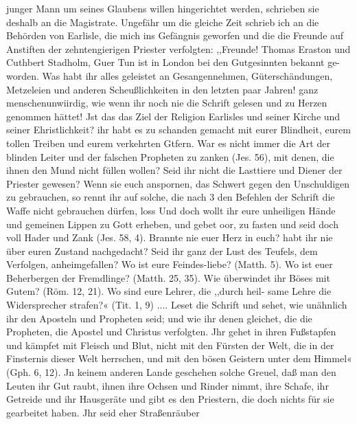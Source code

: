 junger Mann um seines Glaubens willen hingerichtet werden,
schrieben sie deshalb an die Magistrate.
Ungefähr um die gleiche Zeit schrieb ich an die Behörden
von Earlisle, die mich ins Gefängnis geworfen und die die
Freunde auf Anstiften der zehntengierigen Priester verfolgten:
,,Freunde! Thomas Eraston und Cuthbert Stadholm,
Guer Tun ist in London bei den Gutgesinnten bekannt ge-
worden. Was habt ihr alles geleistet an Gesangennehmen,
Güterschändungen, Metzeleien und anderen Scheußlichkeiten in den
letzten paar Jahren! ganz menschenunwiirdig, wie wenn ihr
noch nie die Schrift gelesen und zu Herzen genommen hättet!
Jst das das Ziel der Religion Earlisles und seiner Kirche und
seiner Ehristlichkeit? ihr habt es zu schanden gemacht mit eurer
Blindheit, eurem tollen Treiben und eurem verkehrten Gtfern.
War es nicht immer die Art der blinden Leiter und der falschen
Propheten zu zanken (Jes. 56), mit denen, die ihnen den Mund
nicht füllen wollen? Seid ihr nicht die Lasttiere und Diener der
Priester gewesen? Wenn sie euch anspornen, das Schwert gegen
den Unschuldigen zu gebrauchen, so rennt ihr auf solche, die nach 3
den Befehlen der Schrift die Waffe nicht gebrauchen dürfen, loss
Und doch wollt ihr eure unheiligen Hände und gemeinen Lippen
zu Gott erheben, und gebet oor, zu fasten und seid doch voll
Hader und Zank (Jes. 58, 4). Brannte nie euer Herz in euch?
habt ihr nie über euren Zustand nachgedacht? Seid ihr ganz
der Lust des Teufels, dem Verfolgen, anheimgefallen? Wo ist
eure Feindes-liebe? (Matth. 5). Wo ist euer Beherbergen der
Fremdlinge? (Matth. 25, 35). Wie überwindet ihr Böses mit
Gutem? (Röm. 12, 21). Wo sind eure Lehrer, die ,,durch heil-
same Lehre die Widersprecher strafen?« (Tit. 1, 9) .... Leset die
Schrift und sehet, wie unähnlich ihr den Aposteln und Propheten
seid; und wie ihr denen gleichet, die die Propheten, die Apostel
und Christus verfolgten. Jhr gehet in ihren Fußstapfen und
kämpfet mit Fleisch und Blut, nicht mit den Fürsten der Welt,
die in der Finsternis dieser Welt herrschen, und mit den bösen
Geistern unter dem Himmel« (Gph. 6, 12). Jn keinem anderen
Lande geschehen solche Greuel, daß man den Leuten ihr Gut
raubt, ihnen ihre Ochsen und Rinder nimmt, ihre Schafe, ihr
Getreide und ihr Hausgeräte und gibt es den Priestern, die doch
nichts für sie gearbeitet haben. Jhr seid eher Straßenräuber


